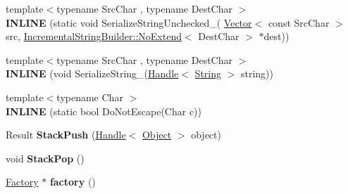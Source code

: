 \begin{DoxyCompactItemize}
\item 
{\footnotesize template$<$typename Src\+Char , typename Dest\+Char $>$ }\\{\bfseries I\+N\+L\+I\+NE} (static void Serialize\+String\+Unchecked\+\_\+(               \hyperlink{classv8_1_1internal_1_1_vector}{Vector}$<$ const Src\+Char $>$ src,               \hyperlink{classv8_1_1internal_1_1_incremental_string_builder_1_1_no_extend}{Incremental\+String\+Builder\+::\+No\+Extend}$<$ Dest\+Char $>$ $\ast$dest))\hypertarget{classv8_1_1internal_1_1_b_a_s_e___e_m_b_e_d_d_e_d_affb732862891e851882f2834af33d911}{}\label{classv8_1_1internal_1_1_b_a_s_e___e_m_b_e_d_d_e_d_affb732862891e851882f2834af33d911}

\item 
{\footnotesize template$<$typename Src\+Char , typename Dest\+Char $>$ }\\{\bfseries I\+N\+L\+I\+NE} (void Serialize\+String\+\_\+(\hyperlink{classv8_1_1internal_1_1_handle}{Handle}$<$ \hyperlink{classv8_1_1internal_1_1_string}{String} $>$ string))\hypertarget{classv8_1_1internal_1_1_b_a_s_e___e_m_b_e_d_d_e_d_a3f723103c775be7edb66bb35f2fc9ce7}{}\label{classv8_1_1internal_1_1_b_a_s_e___e_m_b_e_d_d_e_d_a3f723103c775be7edb66bb35f2fc9ce7}

\item 
{\footnotesize template$<$typename Char $>$ }\\{\bfseries I\+N\+L\+I\+NE} (static bool Do\+Not\+Escape(Char c))\hypertarget{classv8_1_1internal_1_1_b_a_s_e___e_m_b_e_d_d_e_d_a2dbb8a13ddb1693583698ccc7f3f05ef}{}\label{classv8_1_1internal_1_1_b_a_s_e___e_m_b_e_d_d_e_d_a2dbb8a13ddb1693583698ccc7f3f05ef}

\item 
Result {\bfseries Stack\+Push} (\hyperlink{classv8_1_1internal_1_1_handle}{Handle}$<$ \hyperlink{classv8_1_1internal_1_1_object}{Object} $>$ object)\hypertarget{classv8_1_1internal_1_1_b_a_s_e___e_m_b_e_d_d_e_d_a7844c64baa93245c5a0abd57f9f66f5c}{}\label{classv8_1_1internal_1_1_b_a_s_e___e_m_b_e_d_d_e_d_a7844c64baa93245c5a0abd57f9f66f5c}

\item 
void {\bfseries Stack\+Pop} ()\hypertarget{classv8_1_1internal_1_1_b_a_s_e___e_m_b_e_d_d_e_d_a94ca26a281e215219eddf8f6c74a9052}{}\label{classv8_1_1internal_1_1_b_a_s_e___e_m_b_e_d_d_e_d_a94ca26a281e215219eddf8f6c74a9052}

\item 
\hyperlink{classv8_1_1internal_1_1_factory}{Factory} $\ast$ {\bfseries factory} ()\hypertarget{classv8_1_1internal_1_1_b_a_s_e___e_m_b_e_d_d_e_d_ae4b4b4ca9ada9f897db92a9341be8c95}{}\label{classv8_1_1internal_1_1_b_a_s_e___e_m_b_e_d_d_e_d_ae4b4b4ca9ada9f897db92a9341be8c95}


\end{DoxyCompactItemize}
